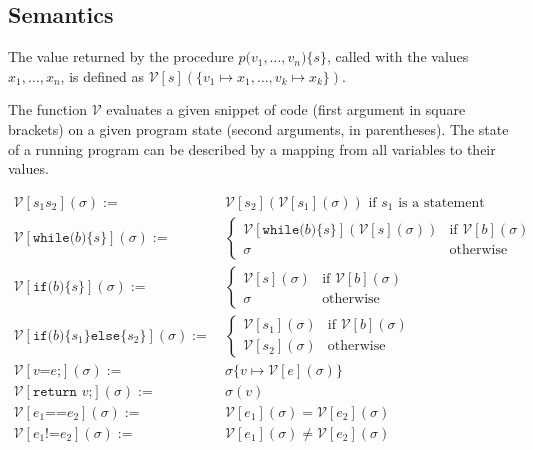 \documentclass{article}
\newcommand\inParens[1]{\texttt{(}#1\texttt{)}}
\newcommand\inBraces[1]{\texttt{\{}#1\texttt{\}}}
\begin{document}
\subsection{Semantics}

The value returned by the procedure $p\texttt{(}v_1, \ldots, v_n\texttt{)\{}s\texttt{\}}$, called with the values $x_1, \ldots, x_n$, is defined as $\mathcal{V}[s](\{v_1 \mapsto x_1, \ldots, v_k \mapsto x_k\})$.

The function $\mathcal{V}$ evaluates a given snippet of code (first argument in square brackets) on a given program state (second arguments, in parentheses). The state of a running program can be described by a mapping from all variables to their values.


\begin{align}
\mathcal{V}[s_1 s_2](\sigma) :=& \ \mathcal{V}[s_2](\mathcal{V}[s_1](\sigma)) \mbox{ if } s_1 \mbox { is a statement}\\
\mathcal{V}[\texttt{while}\inParens{b}\inBraces{s}](\sigma) :=& \ \left\{\begin{array}{ll} \mathcal{V}[\texttt{while}\inParens{b}\inBraces{s}](\mathcal{V}[s](\sigma)) & \mbox{if } \mathcal{V}[b](\sigma) \\ \sigma & \mbox{otherwise} \end{array}\right. \\
\mathcal{V}[\texttt{if}\inParens{b}\inBraces{s}](\sigma) :=& \ \left\{\begin{array}{ll} \mathcal{V}[s](\sigma) & \mbox{if } \mathcal{V}[b](\sigma) \\ \sigma & \mbox{otherwise} \end{array}\right. \\
\mathcal{V}[\texttt{if}\inParens{b}\inBraces{s_1}\texttt{else}\inBraces{s_2}](\sigma) :=& \ \left\{\begin{array}{ll} \mathcal{V}[s_1](\sigma) & \mbox{if } \mathcal{V}[b](\sigma) \\ \mathcal{V}[s_2](\sigma) & \mbox{otherwise} \end{array}\right. \\
\mathcal{V}[v \texttt{=} e\texttt{;}](\sigma) :=& \ \sigma\{v \mapsto \mathcal{V}[e](\sigma)\} \\
\mathcal{V}[\texttt{return } v\texttt{;}](\sigma) :=& \ \sigma(v) \\
\mathcal{V}[e_1 \texttt{==} e_2](\sigma) :=& \ \mathcal{V}[e_1](\sigma) = \mathcal{V}[e_2](\sigma) \\
\mathcal{V}[e_1 \texttt{!=} e_2](\sigma) :=& \ \mathcal{V}[e_1](\sigma) \neq \mathcal{V}[e_2](\sigma) \\

\end{align}
\end{document}

